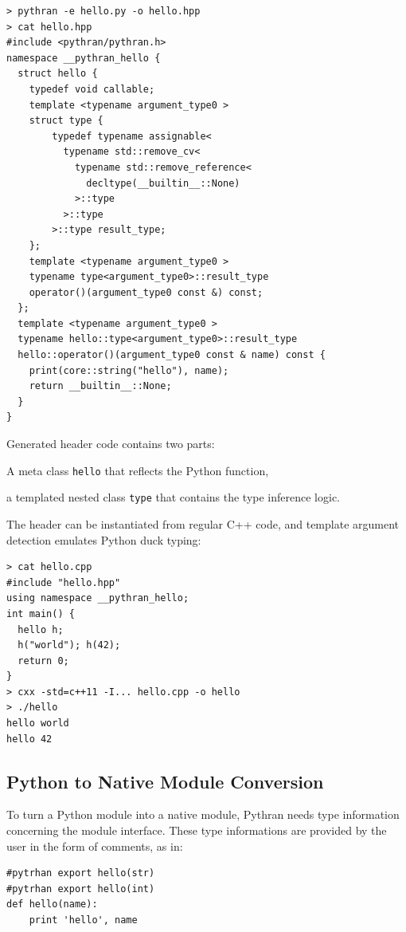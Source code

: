 \documentclass{llncs}
\begin{document}
\begin{lstlisting}
> pythran -e hello.py -o hello.hpp
> cat hello.hpp
#include <pythran/pythran.h>
namespace __pythran_hello {
  struct hello {
    typedef void callable;
    template <typename argument_type0 >
    struct type {
        typedef typename assignable<
          typename std::remove_cv<
            typename std::remove_reference<
              decltype(__builtin__::None)
            >::type
          >::type
        >::type result_type;
    }; 
    template <typename argument_type0 >
    typename type<argument_type0>::result_type
    operator()(argument_type0 const &) const;
  };
  template <typename argument_type0 >
  typename hello::type<argument_type0>::result_type
  hello::operator()(argument_type0 const & name) const {
    print(core::string("hello"), name);
    return __builtin__::None;
  }
}
\end{lstlisting}

Generated header code contains two parts: \begin{inparaenum} \item A meta class
\texttt{hello} that reflects the Python function, \item a templated nested
class \texttt{type} that contains the type inference logic. \end{inparaenum}

The header can be instantiated from regular C++ code, and template argument
detection emulates Python duck typing:

\begin{lstlisting}
> cat hello.cpp
#include "hello.hpp"
using namespace __pythran_hello;
int main() {
  hello h;
  h("world"); h(42);
  return 0;
}
> cxx -std=c++11 -I... hello.cpp -o hello
> ./hello
hello world
hello 42
\end{lstlisting}

\subsection{Python to Native Module Conversion}

To turn a Python module into a native module, Pythran needs type information
concerning the module interface. These type informations are provided by the
user in the form of comments, as in:

\begin{lstlisting}
#pytrhan export hello(str)
#pytrhan export hello(int)
def hello(name):
    print 'hello', name
\end{lstlisting}
\end{document}
